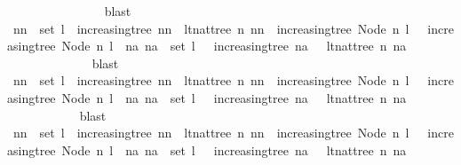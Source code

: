 \begin{isabellebody}
\ \ \ \ \ \ \ \ \ \ \ \ \ \ \isamarkupfalse%
\ blast\ \isacommand{{\isacharbraceright}}\isamarkupfalse%
\isanewline
\ \ \ \ \ \ \ \ \ \ \isamarkupfalse%
\ \isamarkupfalse%
\ {\isachardoublequoteopen}{\isacharparenleft}nn\ {\isasymnotin}\ set\ l\ {\isasymor}\ increasing{\isacharunderscore}tree\ nn\ {\isasymand}\ lt{\isacharunderscore}nat{\isacharunderscore}tree\ n\ nn{\isacharparenright}\ {\isasymand}\ increasing{\isacharunderscore}tree\ {\isacharparenleft}Node\ n\ l{\isacharparenright}\ {\isasymor}\ {\isasymnot}\ increasing{\isacharunderscore}tree\ {\isacharparenleft}Node\ n\ l{\isacharparenright}\ {\isasymand}\ {\isacharparenleft}{\isasymexists}na{\isachardot}\ na\ {\isasymin}\ set\ l\ {\isasymand}\ {\isacharparenleft}{\isasymnot}\ increasing{\isacharunderscore}tree\ na\ {\isasymor}\ {\isasymnot}\ lt{\isacharunderscore}nat{\isacharunderscore}tree\ n\ na{\isacharparenright}{\isacharparenright}{\isachardoublequoteclose}\isanewline
\ \ \ \ \ \ \ \ \ \ \ \ \isamarkupfalse%
\ blast\ \isacommand{{\isacharbraceright}}\isamarkupfalse%
\isanewline
\ \ \ \ \ \ \ \ \isamarkupfalse%
\ \isamarkupfalse%
\ {\isachardoublequoteopen}{\isacharparenleft}nn\ {\isasymnotin}\ set\ l\ {\isasymor}\ increasing{\isacharunderscore}tree\ nn\ {\isasymand}\ lt{\isacharunderscore}nat{\isacharunderscore}tree\ n\ nn{\isacharparenright}\ {\isasymand}\ increasing{\isacharunderscore}tree\ {\isacharparenleft}Node\ n\ l{\isacharparenright}\ {\isasymor}\ {\isasymnot}\ increasing{\isacharunderscore}tree\ {\isacharparenleft}Node\ n\ l{\isacharparenright}\ {\isasymand}\ {\isacharparenleft}{\isasymexists}na{\isachardot}\ na\ {\isasymin}\ set\ l\ {\isasymand}\ {\isacharparenleft}{\isasymnot}\ increasing{\isacharunderscore}tree\ na\ {\isasymor}\ {\isasymnot}\ lt{\isacharunderscore}nat{\isacharunderscore}tree\ n\ na{\isacharparenright}{\isacharparenright}{\isachardoublequoteclose}\isanewline
\ \ \ \ \ \ \ \ \ \ \isamarkupfalse%
\ blast\ \isacommand{{\isacharbraceright}}\isamarkupfalse%
\isanewline
\ \ \ \ \ \ \isamarkupfalse%
\ \isamarkupfalse%
\ {\isachardoublequoteopen}{\isacharparenleft}nn\ {\isasymnotin}\ set\ l\ {\isasymor}\ increasing{\isacharunderscore}tree\ nn\ {\isasymand}\ lt{\isacharunderscore}nat{\isacharunderscore}tree\ n\ nn{\isacharparenright}\ {\isasymand}\ increasing{\isacharunderscore}tree\ {\isacharparenleft}Node\ n\ l{\isacharparenright}\ {\isasymor}\ {\isasymnot}\ increasing{\isacharunderscore}tree\ {\isacharparenleft}Node\ n\ l{\isacharparenright}\ {\isasymand}\ {\isacharparenleft}{\isasymexists}na{\isachardot}\ na\ {\isasymin}\ set\ l\ {\isasymand}\ {\isacharparenleft}{\isasymnot}\ increasing{\isacharunderscore}tree\ na\ {\isasymor}\ {\isasymnot}\ lt{\isacharunderscore}nat{\isacharunderscore}tree\ n\ na{\isacharparenright}{\isacharparenright}{\isachardoublequoteclose}\isanewline

\end{isabellebody}
